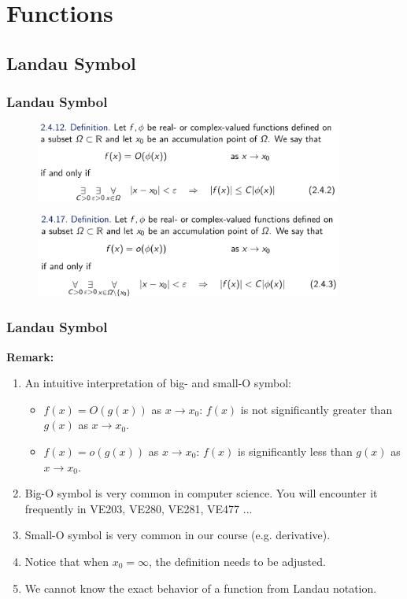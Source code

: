 \documentclass[10pt, t]{beamer}
\begin{document}
\section{Functions}
\subsection{Landau Symbol}
\begin{frame}
    \frametitle{Landau Symbol}
    \begin{figure}[H]
        \centering
        \includegraphics[width=0.9\textwidth]{2020-10-28-00-07-47.png}
    \end{figure}
    \begin{figure}[H]
        \centering
        \includegraphics[width=0.9\textwidth]{2020-10-28-00-08-07.png}
    \end{figure}
\end{frame}

\begin{frame}
    \frametitle{Landau Symbol}

    \textbf{Remark:}
    \begin{enumerate}
        \item
              An intuitive interpretation of big- and small-O symbol:
              \begin{itemize}
                  \item $f(x)=O(g(x))$ as $x\to x_0$: $f(x)$ is not significantly greater than $g(x)$ as $x\to x_0$.
                  \item $f(x)=o(g(x))$ as $x\to x_0$: $f(x)$ is significantly less than $g(x)$ as $x\to x_0$.
              \end{itemize}
        \item Big-O symbol is very common in computer science. You will encounter it frequently in VE203, VE280, VE281, VE477 ...
        \item Small-O symbol is very common in our course (e.g. derivative).
        \item Notice that when $x_0=\infty$, the definition needs to be adjusted.
        \item We cannot know the exact behavior of a function from Landau notation.
    \end{enumerate}
\end{frame}
\end{document}
